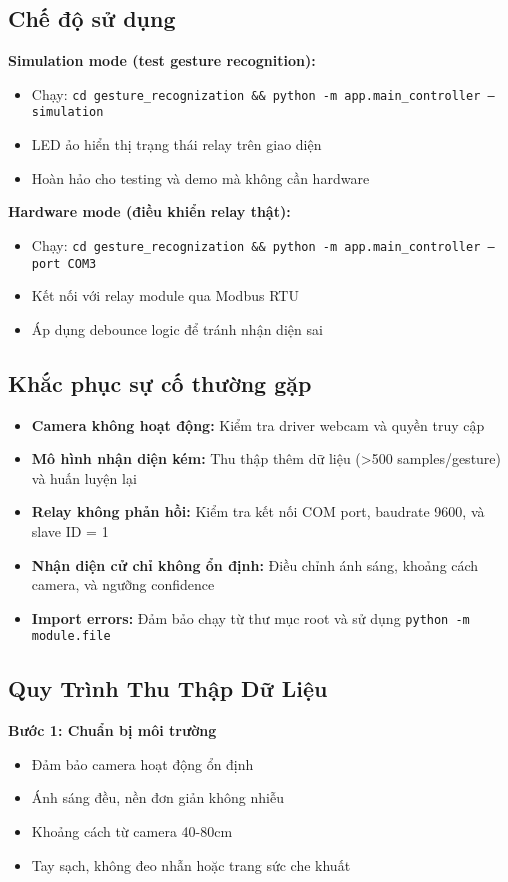 \subsection{Chế độ sử dụng}
\textbf{Simulation mode (test gesture recognition):}
\begin{itemize}
    \item Chạy: \texttt{cd gesture\_recognization \&\& python -m app.main\_controller --simulation}
    \item LED ảo hiển thị trạng thái relay trên giao diện
    \item Hoàn hảo cho testing và demo mà không cần hardware
\end{itemize}

\textbf{Hardware mode (điều khiển relay thật):}
\begin{itemize}
    \item Chạy: \texttt{cd gesture\_recognization \&\& python -m app.main\_controller --port COM3}
    \item Kết nối với relay module qua Modbus RTU
    \item Áp dụng debounce logic để tránh nhận diện sai
\end{itemize}

\subsection{Khắc phục sự cố thường gặp}
\begin{itemize}
    \item \textbf{Camera không hoạt động:} Kiểm tra driver webcam và quyền truy cập
    \item \textbf{Mô hình nhận diện kém:} Thu thập thêm dữ liệu (>500 samples/gesture) và huấn luyện lại
    \item \textbf{Relay không phản hồi:} Kiểm tra kết nối COM port, baudrate 9600, và slave ID = 1
    \item \textbf{Nhận diện cử chỉ không ổn định:} Điều chỉnh ánh sáng, khoảng cách camera, và ngưỡng confidence
    \item \textbf{Import errors:} Đảm bảo chạy từ thư mục root và sử dụng \texttt{python -m module.file}
\end{itemize}

\subsection{Quy Trình Thu Thập Dữ Liệu}

\textbf{Bước 1: Chuẩn bị môi trường}
\begin{itemize}
    \item Đảm bảo camera hoạt động ổn định
    \item Ánh sáng đều, nền đơn giản không nhiễu
    \item Khoảng cách từ camera 40-80cm
    \item Tay sạch, không đeo nhẫn hoặc trang sức che khuất
\end{itemize}

